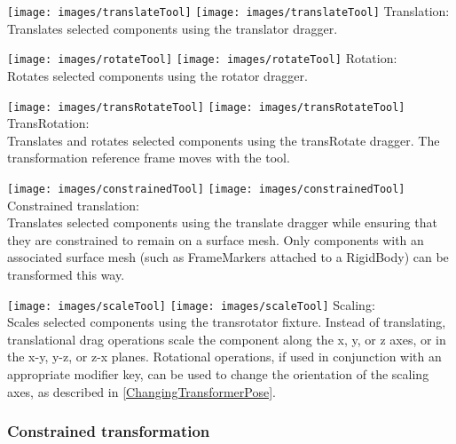 \documentclass{article}
\begin{document}
\vspace{\parskip}
\iflatexml
\phantom{.}\texttt{[image: images/translateTool]}
\else
\texttt{[image: images/translateTool]}
\fi
{\sf Translation:}\\
Translates selected components using the translator dragger.

\vspace{\parskip}
\iflatexml
\phantom{.}\texttt{[image: images/rotateTool]}
\else
\texttt{[image: images/rotateTool]}
\fi
{\sf Rotation:}\\
Rotates selected components using the rotator dragger.

\vspace{\parskip}
\iflatexml
\phantom{.}\texttt{[image: images/transRotateTool]}
\else
\texttt{[image: images/transRotateTool]}
\fi
{\sf TransRotation:}\\
Translates and rotates selected components
using the transRotate dragger. The transformation reference frame
moves with the tool.

\vspace{\parskip}
\iflatexml
\phantom{.}\texttt{[image: images/constrainedTool]}
\else
\texttt{[image: images/constrainedTool]}
\fi 
{\sf Constrained translation:}\\
Translates selected components using the translate dragger while ensuring that
they are constrained to remain on a surface mesh. Only components with
an associated surface mesh (such as FrameMarkers attached to a
RigidBody) can be transformed this way.

\vspace{\parskip}
\iflatexml
\phantom{.}\texttt{[image: images/scaleTool]}
\else
\texttt{[image: images/scaleTool]}
\fi
{\sf Scaling:}\\
Scales selected components using the transrotator
fixture. Instead of translating, translational drag operations
scale the component along the x, y, or z axes, or in the
x-y, y-z, or z-x planes. Rotational operations, if
used in conjunction with an appropriate modifier key,
can be used to change the orientation of the scaling axes,
as described in \ref{ChangingTransformerPose}.


\subsubsection{Constrained transformation}
\end{document}
